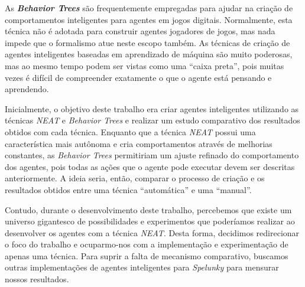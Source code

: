 As \textbf{\textit{Behavior Trees}} são frequentemente empregadas para ajudar na
criação de comportamentos inteligentes para agentes em jogos digitais.
Normalmente, esta técnica não é adotada para construir agentes jogadores de
jogos, mas nada impede que o formalismo atue neste escopo também. As técnicas de
criação de agentes inteligentes baseadas em aprendizado de máquina são muito
poderosas, mas ao mesmo tempo podem ser vistas como uma ``caixa preta'', pois
muitas vezes é difícil de compreender exatamente o que o agente está pensando e
aprendendo.

Inicialmente, o objetivo deste trabalho era criar agentes inteligentes
utilizando as técnicas \textit{NEAT} e \textit{Behavior Trees} e realizar um
estudo comparativo dos resultados obtidos com cada técnica. Enquanto que a
técnica \textit{NEAT} possui uma característica mais autônoma e cria
comportamentos através de melhorias constantes, as \textit{Behavior Trees}
permitiriam um ajuste refinado do comportamento dos agentes, pois todas as ações
que o agente pode executar devem ser descritas anteriormente. A ideia seria,
então, comparar o processo de criação e os resultados obtidos entre uma técnica
``automática'' e uma ``manual''.

Contudo, durante o desenvolvimento deste trabalho, percebemos que existe um
universo gigantesco de possibilidades e experimentos que poderíamos realizar ao
desenvolver os agentes com a técnica \textit{NEAT}. Desta forma, decidimos
redirecionar o foco do trabalho e ocuparmo-nos com a implementação e
experimentação de apenas uma técnica. Para suprir a falta de mecanismo
comparativo, buscamos outras implementações de agentes inteligentes para
\textit{Spelunky} para mensurar nossos resultados.
